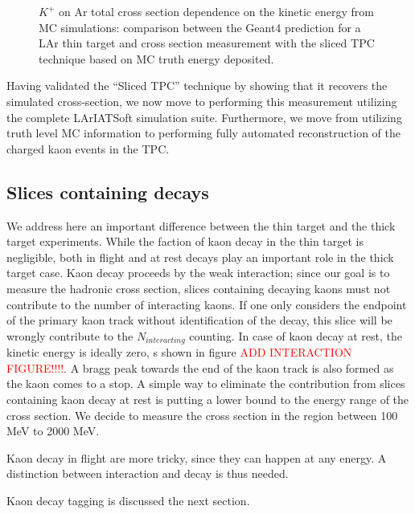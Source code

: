 \begin{figure}[h!]
\centering
\caption{$K^+$ on Ar total cross section dependence on the kinetic energy from MC simulations: comparison between the Geant4 prediction for a LAr thin target and cross section measurement with the sliced TPC technique based on MC truth energy deposited.}
\label{fig:xsplot}
\end{figure}

Having validated the ``Sliced TPC'' technique by showing that it recovers the simulated cross-section, we now move to performing this measurement utilizing the complete LArIATSoft simulation suite.  Furthermore, we move from utilizing truth level MC information to performing fully automated reconstruction of the charged kaon events in the TPC. 



\subsection{Slices containing decays}
We address here an important difference between the thin target and the thick target experiments. While the faction of kaon decay in the thin target is negligible, both in flight and at rest decays play an important role in the thick target case. 
Kaon decay proceeds by the weak interaction; since our goal is to measure the hadronic cross section, slices containing decaying kaons must not contribute to the number of interacting kaons. If one only considers the endpoint of the primary kaon track without identification of the decay, this slice will be wrongly contribute to the $N_{interacting}$ counting. 
In case of kaon decay at rest, the kinetic energy is ideally zero, s shown in figure \textcolor{red}{ADD INTERACTION FIGURE!!!!}. A bragg peak towards the end of the kaon track is also formed as the kaon comes to a stop. A simple way to eliminate the contribution from slices containing kaon decay at rest is putting a lower bound to the energy range of the cross section. We decide to measure the cross section in the region between 100 MeV to 2000 MeV.

Kaon decay in flight are more tricky, since they can happen at any energy. A distinction between interaction and decay is thus needed. 





 Kaon decay tagging is discussed the next section. 




